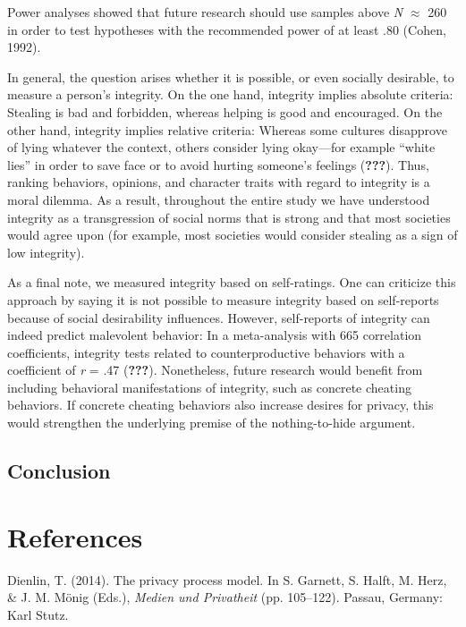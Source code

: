 \documentclass[man]{apa6}
\theoremstyle{definition}
\theoremstyle{definition}
\theoremstyle{definition}
\theoremstyle{remark}
\begin{document}
Power analyses showed that future research should use samples above
\emph{N} \(\approx\) 260 in order to test hypotheses with the
recommended power of at least .80 (Cohen, 1992).

In general, the question arises whether it is possible, or even socially
desirable, to measure a person's integrity. On the one hand, integrity
implies absolute criteria: Stealing is bad and forbidden, whereas
helping is good and encouraged. On the other hand, integrity implies
relative criteria: Whereas some cultures disapprove of lying whatever
the context, others consider lying okay---for example \enquote{white
lies} in order to save face or to avoid hurting someone's feelings
({\textbf{???}}). Thus, ranking behaviors, opinions, and character
traits with regard to integrity is a moral dilemma. As a result,
throughout the entire study we have understood integrity as a
transgression of social norms that is strong and that most societies
would agree upon (for example, most societies would consider stealing as
a sign of low integrity).

As a final note, we measured integrity based on self-ratings. One can
criticize this approach by saying it is not possible to measure
integrity based on self-reports because of social desirability
influences. However, self-reports of integrity can indeed predict
malevolent behavior: In a meta-analysis with 665 correlation
coefficients, integrity tests related to counterproductive behaviors
with a coefficient of \emph{r} = .47 ({\textbf{???}}). Nonetheless,
future research would benefit from including behavioral manifestations
of integrity, such as concrete cheating behaviors. If concrete cheating
behaviors also increase desires for privacy, this would strengthen the
underlying premise of the nothing-to-hide argument.

\hypertarget{conclusion}{%
\subsection{Conclusion}\label{conclusion}}

\newpage

\hypertarget{references}{%
\section{References}\label{references}}

\begingroup
\setlength{\parindent}{-0.5in}
\setlength{\leftskip}{0.5in}

\hypertarget{refs}{}
\leavevmode\hypertarget{ref-Dienlin.2014}{}%
Dienlin, T. (2014). The privacy process model. In S. Garnett, S. Halft,
M. Herz, \& J. M. Mönig (Eds.), \emph{Medien und Privatheit} (pp.
105--122). Passau, Germany: Karl Stutz.
\end{document}
